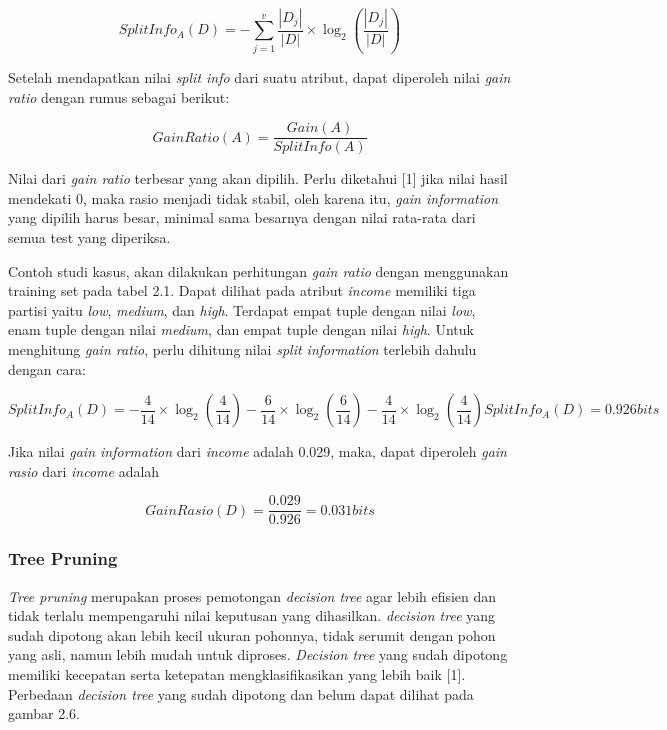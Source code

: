 \begin{displaymath}
	SplitInfo_A(D) = - \sum_{j=1}^v \frac{|D_j|}{|D|} \times \log_2 (\frac{|D_j|}{|D|})
\end{displaymath}

Setelah mendapatkan nilai \textsl{split info} dari suatu atribut, dapat diperoleh nilai \textsl{gain ratio} dengan rumus sebagai berikut:

\begin{displaymath}
	GainRatio(A) = \frac{Gain(A)}{SplitInfo(A)}
\end{displaymath}

Nilai dari \textsl{gain ratio} terbesar yang akan dipilih. Perlu diketahui [1] jika nilai hasil mendekati 0, maka rasio menjadi tidak stabil, oleh karena itu, \textsl{gain information} yang dipilih harus besar, minimal sama besarnya dengan nilai rata-rata dari semua test yang diperiksa.

Contoh studi kasus, akan dilakukan perhitungan \textsl{gain ratio} dengan menggunakan training set pada tabel 2.1. Dapat dilihat pada atribut \textsl{income} memiliki tiga partisi yaitu \textsl{low}, \textsl{medium}, dan \textsl{high}. Terdapat empat tuple dengan nilai \textsl{low}, enam tuple dengan nilai \textsl{medium}, dan empat tuple dengan nilai \textsl{high}. Untuk menghitung \textsl{gain ratio}, perlu dihitung nilai \textsl{split information} terlebih dahulu dengan cara:

\begin{displaymath}
	SplitInfo_A(D) = - \frac{4}{14} \times \log_2 (\frac{4}{14}) - \frac{6}{14} \times \log_2 (\frac{6}{14}) - \frac{4}{14} \times \log_2 (\frac{4}{14})
	SplitInfo_A(D) = 0.926 bits
\end{displaymath} 

Jika nilai \textsl{gain information} dari \textsl{income} adalah 0.029, maka, dapat diperoleh \textsl{gain rasio} dari \textsl{income} adalah

\begin{displaymath}
	GainRasio(D) = \frac{0.029}{0.926} = 0.031 bits
\end{displaymath}

\subsubsection{Tree Pruning}
\textsl{Tree pruning} merupakan proses pemotongan \textsl{decision tree} agar lebih efisien dan tidak terlalu mempengaruhi nilai keputusan yang dihasilkan. \textsl{decision tree} yang sudah dipotong akan lebih kecil ukuran pohonnya, tidak serumit dengan pohon yang asli, namun lebih mudah untuk diproses. \textsl{Decision tree} yang sudah dipotong memiliki kecepatan serta ketepatan mengklasifikasikan yang lebih baik [1]. Perbedaan \textsl{decision tree} yang sudah dipotong dan belum dapat dilihat pada gambar 2.6.

